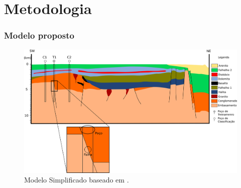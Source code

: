 \documentclass[aspectratio=10]{beamer} %
\begin{document}

\section{Metodologia}

\begin{frame}
	\frametitle{Modelo proposto}
	\begin{figure}[H]
		\centering
		\includegraphics[scale=0.35]{Imagens/Modelo.png}
		\caption{Modelo Simplificado baseado em \cite{Sal2008}.}
		\label{modelo}
	\end{figure}
\end{frame}
\end{document}
